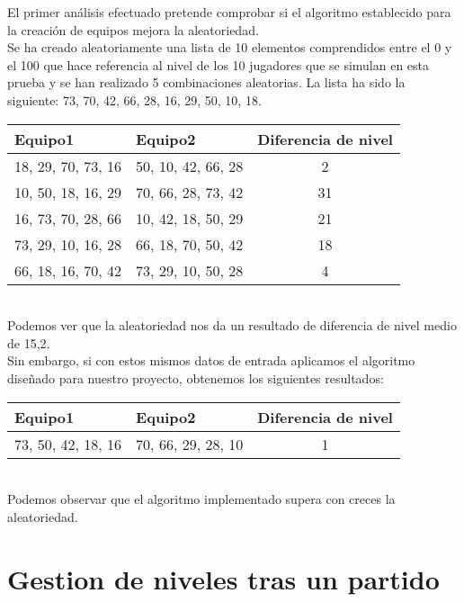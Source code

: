 \newpage

El primer análisis efectuado pretende comprobar si el algoritmo establecido para la creación de equipos mejora la aleatoriedad.\\

Se ha creado aleatoriamente una lista de 10 elementos comprendidos entre el 0 y el 100 que hace referencia al nivel de los 10 jugadores
que se simulan en esta prueba y se han realizado 5 combinaciones aleatorias. La lista ha sido la siguiente:  73, 70, 42, 66, 28, 16, 29, 50, 10, 18.\\


\begin{tabular}{| l | l | c |}
    \hline
    \textbf{Equipo1} & \textbf{Equipo2} & \textbf{Diferencia de nivel}\\
    \hline
    18, 29, 70, 73, 16 & 50, 10, 42, 66, 28 & 2\\
    \hline
    10, 50, 18, 16, 29 & 70, 66, 28, 73, 42 & 31\\
    \hline
    16, 73, 70, 28, 66 & 10, 42, 18, 50, 29 & 21\\
    \hline
    73, 29, 10, 16, 28 & 66, 18, 70, 50, 42 & 18\\
    \hline
    66, 18, 16, 70, 42 & 73, 29, 10, 50, 28 & 4\\
    \hline
\end{tabular}\\


Podemos ver que la aleatoriedad nos da un resultado de diferencia de nivel medio de 15,2.\\

Sin embargo, si con estos mismos datos de entrada aplicamos el algoritmo diseñado para nuestro proyecto, obtenemos los siguientes resultados:\\

\begin{tabular}{| l | l | c |}
    \hline
    \textbf{Equipo1} & \textbf{Equipo2} & \textbf{Diferencia de nivel}\\
    \hline
    73, 50, 42, 18, 16 & 70, 66, 29, 28, 10 & 1\\
    \hline
\end{tabular}\\

Podemos observar que el algoritmo implementado supera con creces la aleatoriedad.

\section{Gestion de niveles tras un partido}

